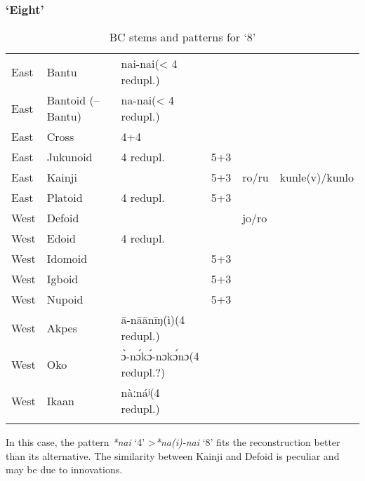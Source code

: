 \subsubsection{‘Eight’}\label{sec:3.1.4.6}
\begin{table}
\caption{\label{tab:3:59}BC stems and patterns for `8'}


\begin{tabularx}{\textwidth}{llQlll}
\lsptoprule

East & {Bantu} & nai-nai\newline (< 4 redupl.) &   &   &  \\
East & {Bantoid} {(–Bantu)} & na-nai\newline (< 4 redupl.) &   &   &  \\
East & {Cross} & 4+4 &   &   &  \\
East & {Jukunoid} & 4 redupl. & 5+3 &   &  \\
East & {Kainji} &   & 5+3 & ro/ru & kunle(v)/kunlo\\
East & {Platoid} & 4 redupl. & 5+3 &   &  \\
West & {Defoid} &   &   & jo/ro &  \\
West & {Edoid} & 4 redupl. &   &   &  \\
West & {Idomoid} &   & 5+3 &   &  \\
West & {Igboid} &   & 5+3 &   &  \\
West & {Nupoid} &   & 5+3 &   &  \\
West & {Akpes} & ā-nāānīŋ(ì)\newline (4 redupl.) &   &   &  \\
West & {Oko} & {\`{ɔ}}-n{\'{ɔ}}k{\'{ɔ}}-nɔk{\'{ɔ}}nɔ\newline(4 redupl.?) &   &   &  \\
West & {Ikaan} & nàːnáʲ\newline (4 redupl.) &   &   &  \\
\lspbottomrule
\end{tabularx}
\end{table}
In this case, the pattern \textit{*nai} ‘4’ >\textit{*na(i)-nai} ‘8’ fits the reconstruction better than its alternative. The similarity between Kainji and Defoid is peculiar and may be due to innovations. 

\clearpage
